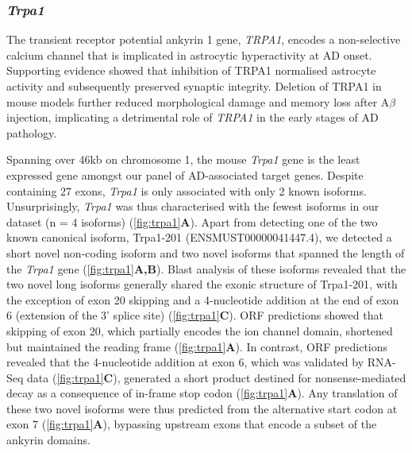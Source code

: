 \newpage
\subsubsection{\textit{Trpa1}}
The transient receptor potential ankyrin 1 gene, \textit{TRPA1}, encodes a non-selective calcium channel that is implicated in astrocytic hyperactivity at AD onset\cite{Payrits2020}. Supporting evidence showed that inhibition of TRPA1 normalised astrocyte activity and subsequently preserved synaptic integrity\cite{Lee2016a}. Deletion of TRPA1 in mouse models further reduced morphological damage and memory loss after A$\beta$ injection, implicating a detrimental role of \textit{TRPA1} in the early stages of AD pathology.\cite{Payrits2020}

Spanning over 46kb on chromosome 1, the mouse \textit{Trpa1} gene is the least expressed gene amongst our panel of AD-associated target genes. Despite containing 27 exons, \textit{Trpa1} is only associated with only 2 known isoforms. Unsurprisingly, \textit{Trpa1} was thus characterised with the fewest isoforms in our dataset (n = 4 isoforms) (\cref{fig:trpa1}\textbf{A}). Apart from detecting one of the two known canonical isoform, Trpa1-201 (ENSMUST00000041447.4), we detected a short novel non-coding isoform and two novel isoforms that spanned the length of the \textit{Trpa1} gene (\cref{fig:trpa1}\textbf{A,B}). Blast analysis of these isoforms revealed that the two novel long isoforms generally shared the exonic structure of Trpa1-201, with the exception of exon 20 skipping and a 4-nucleotide addition at the end of exon 6 (extension of the 3' splice site) (\cref{fig:trpa1}\textbf{C}). ORF predictions showed that skipping of exon 20, which partially encodes the ion channel domain, shortened but maintained the reading frame (\cref{fig:trpa1}\textbf{A}). In contrast, ORF predictions revealed that the 4-nucleotide addition at exon 6, which was validated by RNA-Seq data (\cref{fig:trpa1}\textbf{C}), generated a short product destined for nonsense-mediated decay as a consequence of in-frame stop codon (\cref{fig:trpa1}\textbf{A}). Any translation of these two novel isoforms were thus predicted from the alternative start codon at exon 7 (\cref{fig:trpa1}\textbf{A}), bypassing upstream exons that encode a subset of the ankyrin domains.     

